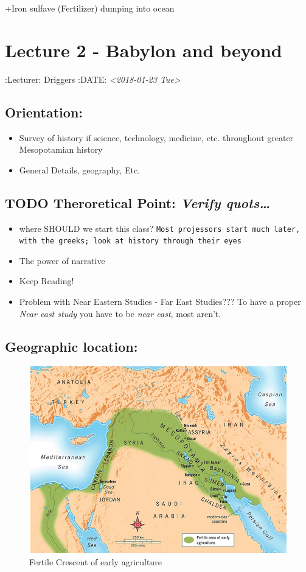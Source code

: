 \documentclass[11pt]{article}
\begin{document}
+Iron sulfave (Fertilizer) dumping into ocean


\section{Lecture 2 - Babylon and beyond}
\label{sec-3}
:Lecturer: Driggers
:DATE: \textit{<2018-01-23 Tue>}

\subsection{Orientation:}
\label{sec-3-1}
\begin{itemize}
\item Survey of history if science, technology, medicine, etc. throughout greater Mesopotamian history
\item General Details, geography, Etc.
\end{itemize}

\subsection{{\bfseries\sffamily TODO} Theroretical Point: \emph{Verify quots\ldots{}}}
\label{sec-3-2}
\begin{itemize}
\item where SHOULD we start this class?
\texttt{Most projessors start much later, with the greeks; look at history through their eyes}

\item The power of narrative

\item Keep Reading!

\item Problem with Near Eastern Studies - Far East Studies???
To have a proper \emph{Near east study} you have to be \emph{near east}, most aren't.
\end{itemize}

\subsection{Geographic location:}
\label{sec-3-3}
\begin{figure}[htb]
\centering
\includegraphics[width=.9\linewidth]{./img/fertileCrescent.png}
\caption{Fertile Crescent of early agriculture}
\end{figure}
\end{document}
